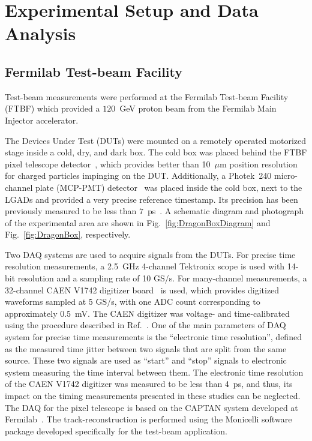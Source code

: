 \documentclass[preprint,1p]{elsarticle}
\begin{document}
\section{Experimental Setup and Data Analysis} 
\label{sec:setup}
\subsection{Fermilab Test-beam Facility}
Test-beam measurements were performed at the Fermilab Test-beam Facility (FTBF)
which provided a $120$~GeV proton beam from the Fermilab Main Injector
accelerator. 

The Devices Under Test (DUTs) were mounted on a remotely operated
motorized stage inside a cold, dry, and dark box. The cold box was placed behind the FTBF pixel telescope detector~\cite{KWAN2016162}, which provides better than 10~$\mu$m position resolution for charged
particles impinging on the DUT. Additionally, a Photek~240 micro-channel plate
(MCP-PMT) detector~\cite{Anderson:2015gha, MCPFastCaloNIMA,
Ronzhin2015288,Ronzhin201552} was placed inside the cold box, next to the LGADs and provided a very precise reference timestamp. Its precision has been previously 
measured to be less than $7$~ps~\cite{Ronzhin2015288}. A schematic diagram and
photograph of the experimental area are shown in Fig.~\ref{fig:DragonBoxDiagram}
and Fig.~\ref{fig:DragonBox}, respectively. 

Two DAQ systems are used to acquire signals from the DUTs. For precise time resolution measurements, a \SI{2.5}{\giga\Hz} 4-channel Tektronix scope is used with 14-bit resolution and a sampling rate of 10 GS/s.
For many-channel measurements, a 32-channel CAEN V1742 digitizer board~\cite{CAENDRS} is used, which provides digitized waveforms sampled at 5 GS/s, with one ADC count corresponding to approximately 0.5~mV. The CAEN digitizer was
voltage- and time-calibrated using the procedure described in
Ref.~\cite{Kim201467}. One of the main parameters of DAQ system for precise time
measurements is the ``electronic time resolution'', defined as the measured time
jitter between two signals that are split from the same source. These two
signals are used as ``start'' and ``stop'' signals to electronic system
measuring the time interval between them. The electronic time resolution of the
CAEN V1742 digitizer was measured to be less than 4~ps, and thus, its impact on
the timing measurements presented in these studies can be neglected. The DAQ for
the pixel telescope is based on the CAPTAN system developed at
Fermilab~\cite{KWAN2016162}. The track-reconstruction is performed using the
Monicelli software package developed specifically for the test-beam application. 
\end{document}
